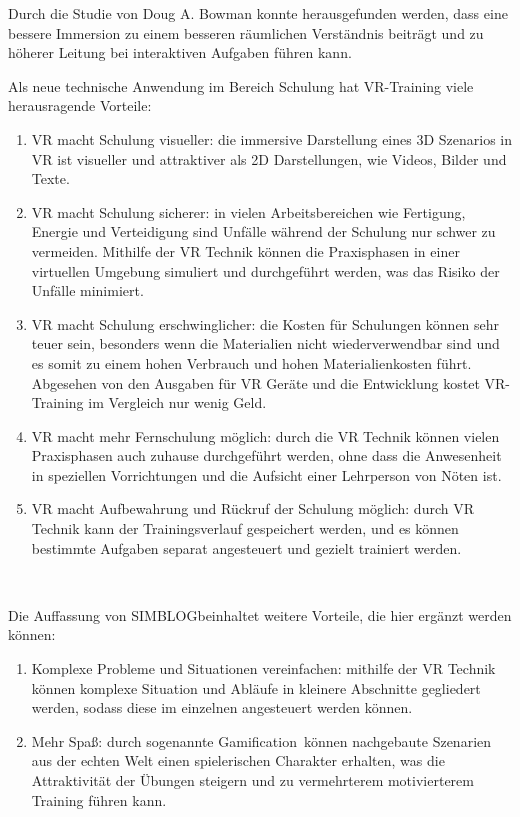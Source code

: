 Durch die Studie von Doug A. Bowman konnte herausgefunden werden, dass eine bessere Immersion zu einem besseren räumlichen Verständnis beiträgt und zu höherer Leitung bei interaktiven Aufgaben führen kann. \citep{27}

Als neue technische Anwendung im Bereich Schulung hat VR-Training viele herausragende Vorteile\citep{15}:

\begin{enumerate}
\item VR macht Schulung visueller: die immersive Darstellung eines 3D Szenarios in VR ist visueller und attraktiver als 2D Darstellungen, wie Videos, Bilder und Texte.
\item VR macht Schulung sicherer: in vielen Arbeitsbereichen wie Fertigung, Energie und Verteidigung sind Unfälle während der Schulung nur schwer zu vermeiden. Mithilfe der VR Technik können die Praxisphasen in einer virtuellen Umgebung simuliert und durchgeführt werden, was das Risiko der Unfälle minimiert.
\item VR macht Schulung erschwinglicher: die Kosten für Schulungen können sehr teuer sein, besonders wenn die Materialien nicht wiederverwendbar sind und es somit zu einem hohen Verbrauch und hohen Materialienkosten führt. Abgesehen von den Ausgaben für VR Geräte und die Entwicklung kostet VR-Training im Vergleich nur wenig Geld.
\item VR macht mehr Fernschulung möglich: durch die VR Technik können vielen Praxisphasen auch zuhause durchgeführt werden, ohne dass die Anwesenheit in speziellen Vorrichtungen und die Aufsicht einer Lehrperson von Nöten ist.
\item VR macht Aufbewahrung und Rückruf der Schulung möglich: durch VR Technik kann der Trainingsverlauf gespeichert werden, und es können bestimmte Aufgaben separat angesteuert und gezielt trainiert werden.
\end{enumerate}\

Die Auffassung von SIMBLOG\citep{16}beinhaltet weitere Vorteile, die hier ergänzt werden können:

\begin{enumerate}
\item Komplexe Probleme und Situationen vereinfachen: mithilfe der VR Technik können komplexe Situation und Abläufe in kleinere Abschnitte gegliedert werden, sodass diese im einzelnen angesteuert werden können.
\item Mehr Spaß: durch sogenannte \glqq Gamification\grqq\ können nachgebaute Szenarien aus der echten Welt einen spielerischen Charakter erhalten, was die Attraktivität der Übungen steigern und zu vermehrterem motivierterem Training führen kann.
\end{enumerate}\

